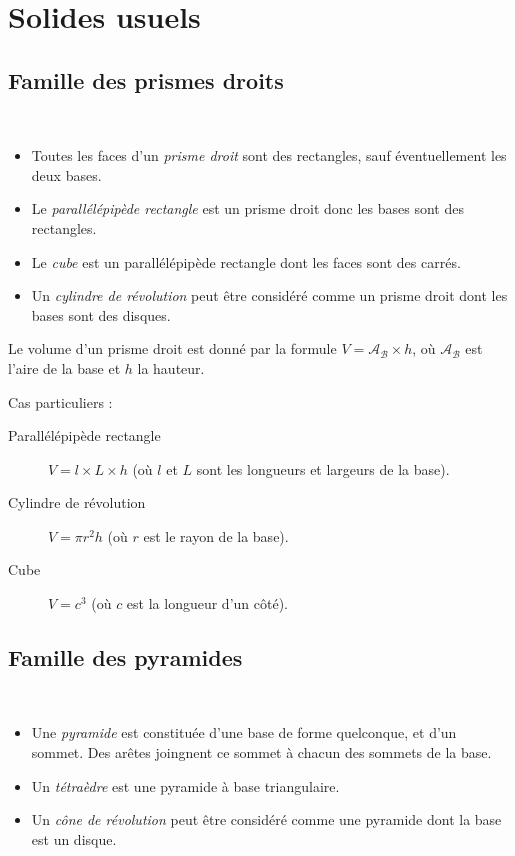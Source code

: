 \section{Solides usuels}

\subsection{Famille des prismes droits}

\begin{desc}~
  \begin{itemize}
    \item Toutes les faces d'un \emph{prisme droit} sont des rectangles, sauf éventuellement les deux bases.
    \item Le \emph{parallélépipède rectangle} est un prisme droit donc les bases sont des rectangles.
    \item Le \emph{cube} est un parallélépipède rectangle dont les faces sont des carrés.
    \item Un \emph{cylindre de révolution} peut être considéré comme un prisme droit dont les bases sont des disques.
  \end{itemize}
\end{desc}

\begin{propriete}
  Le volume d'un prisme droit est donné par la formule $V=\mathcal{A_B}\times h$, où $\mathcal{A_B}$ est l'aire de la base et $h$ la hauteur.

  Cas particuliers :
  \begin{description}
    \item[Parallélépipède rectangle] $V=l\times L\times h$ (où $l$ et $L$ sont les longueurs et largeurs de la base).
    \item[Cylindre de révolution] $V=\pi r^2h$ (où $r$ est le rayon de la base).
    \item[Cube] $V=c^3$ (où $c$ est la longueur d'un côté).
  \end{description}
\end{propriete}

\subsection{Famille des pyramides}

\begin{desc}~
  \begin{itemize}
    \item Une \emph{pyramide} est constituée d'une base de forme quelconque, et d'un sommet. Des arêtes joingnent ce sommet à chacun des sommets de la base.
    \item Un \emph{tétraèdre} est une pyramide à base triangulaire.
    \item Un \emph{cône de révolution} peut être considéré comme une pyramide dont la base est un disque.
  \end{itemize}
\end{desc}

